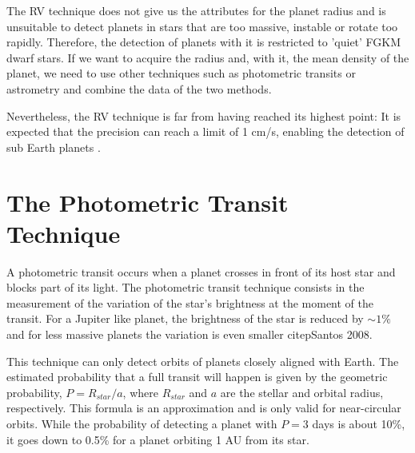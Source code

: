 \documentclass[dvips,12pt,a4paper]{report}
\begin{document}
The RV technique does not give us the attributes for the planet radius and is unsuitable to detect planets in stars that are too massive, instable or rotate too rapidly. Therefore, the detection of planets with it is restricted to 'quiet' FGKM dwarf stars. If we want to acquire the radius and, with it, the mean density of the planet, we need to use other techniques such as photometric transits or astrometry and combine the data of the two methods.

Nevertheless, the RV technique is far from having reached its highest point: It is expected that the precision can reach a limit of 1 cm/s, enabling the detection of sub Earth planets \citep{Lovis-2006b}. 




\section{The Photometric Transit Technique}
\label{transit}
A photometric transit occurs when a planet crosses in front of its host star and blocks part of its light. 
The photometric transit technique consists in the measurement of the variation of the star's brightness at the moment of the transit. For a Jupiter like planet, the brightness of the star is reduced by $\sim 1\%$ and for less massive planets the variation is even smaller citep{Santos 2008}. %

This technique can only detect orbits of planets closely aligned with Earth. The estimated probability that a full transit will happen is given by the geometric probability, $P=R_{star}/a$, where $R_{star}$ and $a$ are the stellar and orbital radius, respectively. This formula is an approximation and is only valid for near-circular orbits. While the probability of detecting a planet with $P=3$ days is about 10\%, it goes down to 0.5\% for a planet orbiting 1 AU from its star.
\end{document}
